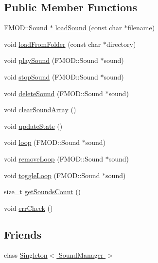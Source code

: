 \subsection*{Public Member Functions}
\begin{DoxyCompactItemize}
\item 
F\-M\-O\-D\-::\-Sound $\ast$ \hyperlink{class_symp_1_1_sound_manager_a8ae15c9346ad44c55a027d0ecab72740}{load\-Sound} (const char $\ast$filename)
\item 
void \hyperlink{class_symp_1_1_sound_manager_ac24c55e936b7a7c9622b219f8d5701eb}{load\-From\-Folder} (const char $\ast$directory)
\item 
void \hyperlink{class_symp_1_1_sound_manager_a7df78a552f790c22ecc458d164a9494f}{play\-Sound} (F\-M\-O\-D\-::\-Sound $\ast$sound)
\item 
void \hyperlink{class_symp_1_1_sound_manager_a1177fe135a64a403f5b45bb46a0f2a5c}{stop\-Sound} (F\-M\-O\-D\-::\-Sound $\ast$sound)
\item 
void \hyperlink{class_symp_1_1_sound_manager_a9447c4f332e8139d1385fe2bf4212ce8}{delete\-Sound} (F\-M\-O\-D\-::\-Sound $\ast$sound)
\item 
void \hyperlink{class_symp_1_1_sound_manager_af80ac26864c4c5ce194ba9a83c8c77eb}{clear\-Sound\-Array} ()
\item 
void \hyperlink{class_symp_1_1_sound_manager_ad86129cd980ace0c19890a9e46cc8531}{update\-State} ()
\item 
void \hyperlink{class_symp_1_1_sound_manager_a11622d083566118aaf622953749d3446}{loop} (F\-M\-O\-D\-::\-Sound $\ast$sound)
\item 
void \hyperlink{class_symp_1_1_sound_manager_ac912ad7f040547f3cda9ce5f7bd1522a}{remove\-Loop} (F\-M\-O\-D\-::\-Sound $\ast$sound)
\item 
void \hyperlink{class_symp_1_1_sound_manager_a27cd658d55484cec5ced9e81057426e5}{toggle\-Loop} (F\-M\-O\-D\-::\-Sound $\ast$sound)
\item 
size\-\_\-t \hyperlink{class_symp_1_1_sound_manager_ab96e94d7739ae86a580417fc19a88037}{get\-Sounds\-Count} ()
\item 
void \hyperlink{class_symp_1_1_sound_manager_aa82b83dfbd0b594da8373304e9b414ce}{err\-Check} ()
\end{DoxyCompactItemize}
\subsection*{Friends}
\begin{DoxyCompactItemize}
\item 
class \hyperlink{class_symp_1_1_sound_manager_a0caa66cbb01357370233dc2bd5fdb585}{Singleton$<$ Sound\-Manager $>$}
\end{DoxyCompactItemize}
